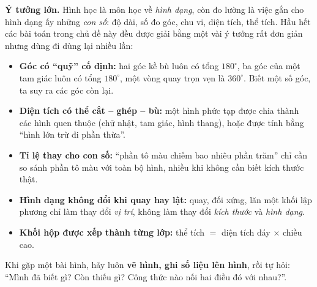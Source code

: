 \documentclass[11pt]{article}
\begin{document}
\begin{knowbox}
\textbf{Ý tưởng lớn.} Hình học là môn học về \emph{hình dạng}, còn đo lường là việc gắn cho hình dạng ấy những \emph{con số}: độ dài, số đo góc, chu vi, diện tích, thể tích. Hầu hết các bài toán trong chủ đề này đều được giải bằng một vài ý tưởng rất đơn giản nhưng dùng đi dùng lại nhiều lần:
\begin{itemize}[leftmargin=1.3em,itemsep=1pt,topsep=2pt]
  \item \textbf{Góc có ``quỹ'' cố định:} hai góc kề bù luôn có tổng $180^\circ$, ba góc của một tam giác luôn có tổng $180^\circ$, một vòng quay trọn vẹn là $360^\circ$. Biết một số góc, ta suy ra các góc còn lại.
  \item \textbf{Diện tích có thể cắt -- ghép -- bù:} một hình phức tạp được chia thành các hình quen thuộc (chữ nhật, tam giác, hình thang), hoặc được tính bằng ``hình lớn trừ đi phần thừa''.
  \item \textbf{Tỉ lệ thay cho con số:} ``phần tô màu chiếm bao nhiêu phần trăm'' chỉ cần so sánh phần tô màu với toàn bộ hình, nhiều khi không cần biết kích thước thật.
  \item \textbf{Hình dạng không đổi khi quay hay lật:} quay, đối xứng, lăn một khối lập phương chỉ làm thay đổi \emph{vị trí}, không làm thay đổi \emph{kích thước} và \emph{hình dạng}.
  \item \textbf{Khối hộp được xếp thành từng lớp:} thể tích $=$ diện tích đáy $\times$ chiều cao.
\end{itemize}
Khi gặp một bài hình, hãy luôn \textbf{vẽ hình, ghi số liệu lên hình}, rồi tự hỏi: ``Mình đã biết gì? Còn thiếu gì? Công thức nào nối hai điều đó với nhau?''.
\end{knowbox}
\vspace{0.3cm}
\end{document}
